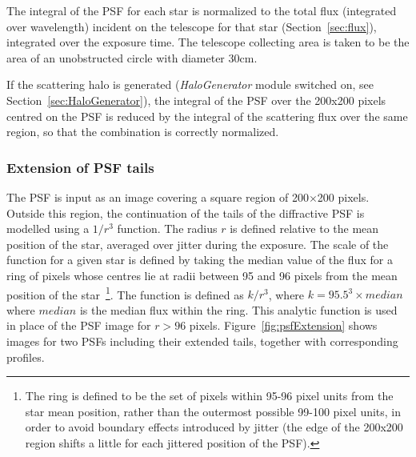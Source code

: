 \documentclass[11pt]{article}      %
\begin{document}
The integral of the PSF for each star is normalized to the total flux (integrated over wavelength) incident on the telescope for that star (Section~\ref{sec:flux}), integrated over the exposure time. The telescope collecting area is taken to be the area of an unobstructed circle with diameter 30cm.

If the scattering halo is generated ({\it HaloGenerator} module switched on, see Section~\ref{sec:HaloGenerator}), the integral of the PSF over the 200x200 pixels centred on the PSF is reduced by the integral of the scattering flux over the same region, so that the combination is correctly normalized.

\subsubsection{Extension of PSF tails}
\label{sec:extendedPSF}

The PSF is input as an image covering a square region of 200$\times$200 pixels. Outside this region, the continuation of the tails of the diffractive PSF is modelled using a $1/r^3$ function. The radius $r$ is defined relative to the mean position of the star, averaged over jitter during the exposure. The scale of the function for a given star is defined by taking the median value of the flux for a ring of pixels whose centres lie at radii between 95 and 96 pixels from the mean position of the star~\footnote{The ring is defined to be the set of pixels within 95-96 pixel units from the star mean position, rather than the outermost possible 99-100 pixel units, in order to avoid boundary effects introduced by jitter (the edge of the 200x200 region shifts a little for each jittered position of the PSF).}. The function is defined as $k/r^3$, where $k = 95.5^3 \times median$ where $median$ is the median flux within the ring. This analytic function is used in place of the PSF image for $r>96$ pixels. Figure~\ref{fig:psfExtension} shows images for two PSFs including their extended tails, together with corresponding profiles.
\end{document}
